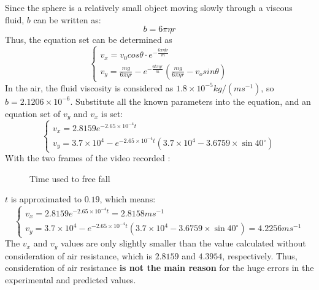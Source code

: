 \documentclass{article}
\begin{document}
        Since the sphere is a relatively small object moving slowly through a viscous fluid, $b$ can be written as:
        \begin{equation}
            b = 6\pi\eta r \nonumber
        \end{equation}
        Thus, the equation set can be determined as
        \begin{equation}
           \begin{cases}
               v_x = v_0 cos\theta\cdot e^{-\frac{6\pi\eta tr}{m}}\\
               v_y = \frac{mg}{6\pi\eta r} - e^{-\frac{6t\pi\eta r}{m}}(\frac{mg}{6\pi\eta r}-v_osin\theta)
           \end{cases} 
        \end{equation}
        In the air, the fluid viscosity is considered as $1.8\times10^{-5}kg/(ms^{-1})$, so $b = 2.1206\times 10^{-6}$. Substitute all the known parameters into the equation, and an equation set of $v_y$ and $v_x$ is set:
        \begin{equation}
            \begin{cases}
               v_x = 2.8159e^{-2.65\times10^{-4}t} \\
               v_y = 3.7\times10^4 - e^{-2.65\times10^{-4}t}(3.7\times10^4-3.6759\times\sin{40^\circ}) \nonumber 
            \end{cases}
        \end{equation}
        With the two frames of the video\cite{youtube} recorded :
        \begin{figure}[H]
            \centering
            \caption{Time used to free fall}
        \end{figure}
        $t$ is approximated to $0.19$, which means:
        \begin{equation}
           \begin{cases}
               v_x = 2.8159e^{-2.65\times10^{-4}t} = 2.8158ms^{-1} \\
               v_y = 3.7\times10^4 - e^{-2.65\times10^{-4}t}(3.7\times10^4-3.6759\times\sin{40^\circ}) = 4.2256ms^{-1} 
           \end{cases} 
        \end{equation}
        The $v_x$ and $v_y$ values are only slightly smaller than the value calculated without consideration of air resistance, which is $2.8159$ and $4.3954$, respectively. Thus, consideration of air resistance \textbf{is not the main reason} for the huge errors in the experimental and predicted values.
\end{document}
